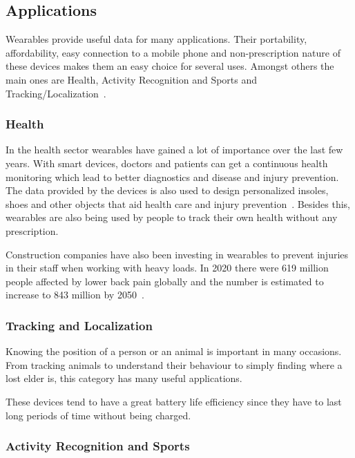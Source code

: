 \subsection{Applications}
\label{sub:aplications}

Wearables provide useful data for many applications. Their portability, affordability, easy connection to a mobile phone and non-prescription nature of these devices
 makes them an easy choice for several uses. Amongst others the main ones are Health, Activity Recognition and Sports and Tracking/Localization~\cite{wearablesAndIOT}. 



\subsubsection{Health}
\label{ssub:health}

In the health sector wearables have gained a lot of importance over the last few years. With smart devices, doctors and patients can get a continuous health monitoring which lead to better diagnostics and disease and injury prevention. 
The data provided by the devices is also used to design personalized insoles, shoes and other objects that aid health care and injury prevention~\cite{injuryWalking}.
Besides this, wearables are also being used by people to track their own health without any prescription. 

Construction companies have also been investing in wearables to prevent injuries in their staff when working with heavy loads. In 2020 there were 619 million people affected by lower 
back pain globally and the number is estimated to increase to 843 million by 2050~\cite{lowerBack}.


\subsubsection{Tracking and Localization}
\label{ssub:trackingAndLocalization}

Knowing the position of a person or an animal is important in many occasions. From tracking animals to understand their behaviour to simply finding where a lost elder is, this category has many useful applications.

These devices tend to have a great battery life efficiency since they have to last long periods of time without being charged. 

\subsubsection{Activity Recognition and Sports}
\label{ssub:activityRecognitionAndSports}

